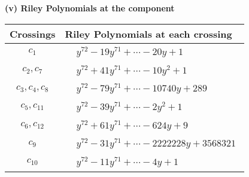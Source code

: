 \documentclass[1p]{elsarticle_modified}
\theoremstyle{definition}
\begin{document}
\newpage\renewcommand{\arraystretch}{1}
\flushleft \textbf{(v) Riley Polynomials at the component}\newline \\
\begin{tabular}{m{50pt}|m{274pt}}
Crossings & \hspace{64pt}Riley Polynomials at each crossing \\
\hline $$\begin{aligned}c_{1}\end{aligned}$$&$\begin{aligned}
&y^{72}-19 y^{71}+\cdots-20 y+1
\end{aligned}$\\
\hline $$\begin{aligned}c_{2},c_{7}\end{aligned}$$&$\begin{aligned}
&y^{72}+41 y^{71}+\cdots-10 y^2+1
\end{aligned}$\\
\hline $$\begin{aligned}c_{3},c_{4},c_{8}\end{aligned}$$&$\begin{aligned}
&y^{72}-79 y^{71}+\cdots-10740 y+289
\end{aligned}$\\
\hline $$\begin{aligned}c_{5},c_{11}\end{aligned}$$&$\begin{aligned}
&y^{72}-39 y^{71}+\cdots-2 y^2+1
\end{aligned}$\\
\hline $$\begin{aligned}c_{6},c_{12}\end{aligned}$$&$\begin{aligned}
&y^{72}+61 y^{71}+\cdots-624 y+9
\end{aligned}$\\
\hline $$\begin{aligned}c_{9}\end{aligned}$$&$\begin{aligned}
&y^{72}-31 y^{71}+\cdots-2222228 y+3568321
\end{aligned}$\\
\hline $$\begin{aligned}c_{10}\end{aligned}$$&$\begin{aligned}
&y^{72}-11 y^{71}+\cdots-4 y+1
\end{aligned}$\\
\hline
\end{tabular}\\~\\
\end{document}
